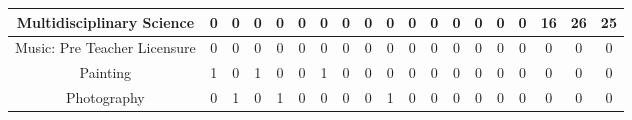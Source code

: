 \documentclass[10pt]{article}
\begin{document}
\begin{landscape}
\begin{longtable}[c]{|ccccccccccccccccccc|}
	\multicolumn{1}{|c|}{Multidisciplinary Science}                  & \multicolumn{1}{c|}{0}          & \multicolumn{1}{c|}{0}          & \multicolumn{1}{c|}{0}          & \multicolumn{1}{c|}{0}          & \multicolumn{1}{c|}{0}          & \multicolumn{1}{c|}{0}          & \multicolumn{1}{c|}{0}          & \multicolumn{1}{c|}{0}          & \multicolumn{1}{c|}{0}          & \multicolumn{1}{c|}{0}          & \multicolumn{1}{c|}{0}          & \multicolumn{1}{c|}{0}          & \multicolumn{1}{c|}{0}          & \multicolumn{1}{c|}{0}          & \multicolumn{1}{c|}{0}          & \multicolumn{1}{c|}{16}         & \multicolumn{1}{c|}{26}         & 25         \\ \hline
	\multicolumn{1}{|c|}{Music: Pre Teacher Licensure}               & \multicolumn{1}{c|}{0}          & \multicolumn{1}{c|}{0}          & \multicolumn{1}{c|}{0}          & \multicolumn{1}{c|}{0}          & \multicolumn{1}{c|}{0}          & \multicolumn{1}{c|}{0}          & \multicolumn{1}{c|}{0}          & \multicolumn{1}{c|}{0}          & \multicolumn{1}{c|}{0}          & \multicolumn{1}{c|}{0}          & \multicolumn{1}{c|}{0}          & \multicolumn{1}{c|}{0}          & \multicolumn{1}{c|}{0}          & \multicolumn{1}{c|}{0}          & \multicolumn{1}{c|}{0}          & \multicolumn{1}{c|}{0}          & \multicolumn{1}{c|}{0}          & 0          \\ \hline
	\multicolumn{1}{|c|}{Painting}                                   & \multicolumn{1}{c|}{1}          & \multicolumn{1}{c|}{0}          & \multicolumn{1}{c|}{1}          & \multicolumn{1}{c|}{0}          & \multicolumn{1}{c|}{0}          & \multicolumn{1}{c|}{1}          & \multicolumn{1}{c|}{0}          & \multicolumn{1}{c|}{0}          & \multicolumn{1}{c|}{0}          & \multicolumn{1}{c|}{0}          & \multicolumn{1}{c|}{0}          & \multicolumn{1}{c|}{0}          & \multicolumn{1}{c|}{0}          & \multicolumn{1}{c|}{0}          & \multicolumn{1}{c|}{0}          & \multicolumn{1}{c|}{0}          & \multicolumn{1}{c|}{0}          & 0          \\ \hline
	\multicolumn{1}{|c|}{Photography}                                & \multicolumn{1}{c|}{0}          & \multicolumn{1}{c|}{1}          & \multicolumn{1}{c|}{0}          & \multicolumn{1}{c|}{1}          & \multicolumn{1}{c|}{0}          & \multicolumn{1}{c|}{0}          & \multicolumn{1}{c|}{0}          & \multicolumn{1}{c|}{0}          & \multicolumn{1}{c|}{1}          & \multicolumn{1}{c|}{0}          & \multicolumn{1}{c|}{0}          & \multicolumn{1}{c|}{0}          & \multicolumn{1}{c|}{0}          & \multicolumn{1}{c|}{0}          & \multicolumn{1}{c|}{0}          & \multicolumn{1}{c|}{0}          & \multicolumn{1}{c|}{0}          & 0          \\ \hline

\end{longtable}
\end{landscape}
\end{document}
